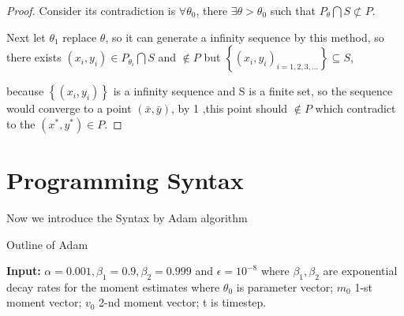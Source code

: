 \documentclass[11pt,en,bibstyle=ieeetr]{elegantpaper}
\begin{document}
\begin{proof}
	Consider its contradiction is $ \forall \theta_0 $, there $ \exists \theta > \theta_0 $ such that $ P_\theta \bigcap S \nsubset P$.
	
	Next let $ \theta_1 $ replace $ \theta$, so it can generate a infinity sequence by this method, so there exists $ (x_i,y_i) \in P_{\theta_i} \bigcap S $ and $ \not\in P $ but $ \left\{ (x_i,y_i)_{i=1,2,3,...} \right\} \subseteq S $, 
	
	because $ \left\{ (x_i,y_i) \right\}  $ is a infinity sequence and S is a finite set, so the sequence would converge to a point $ (\bar{x},\bar{y}) $, by 1 ,this point should $ \not\in P $ which contradict to the $ (x^*,y^*) \in P $. 
\end{proof}








\section{Programming Syntax}

Now we introduce the Syntax by Adam algorithm 
 \begin{algorithm}[H]
        \caption{Outline of Adam}\label{alg1}
        \begin{algorithmic}[1]
            \newline
			\textbf{Input:} $ \alpha = 0.001,\beta_1 = 0.9,\beta_2 = 0.999$ and $ \epsilon = 10^{-8} $ where $ \beta_1,\beta_2 $ are exponential decay rates for the moment estimates
			\newline
			where $\theta_0 $ is parameter vector; $ m_0$  1-st moment vector; $ v_0 $ 2-nd moment vector; t is timestep.
			\EndWhile
            \EndProcedure
        \end{algorithmic}
        \label{alg_1}
    \end{algorithm}
\end{document}
